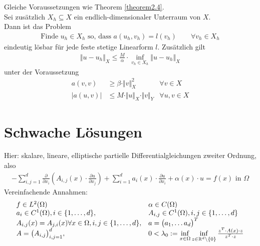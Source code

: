 \begin{theorem}\label{theorem2.5}
	Gleiche Voraussetzungen wie Theorem \ref{theorem2.4}.\\
	Sei zusätzlich $X_h\subseteq X$ ein endlich-dimensionaler Unterraum von $X$.\\
	Dann ist das Problem
	\begin{align*}
		\text{Finde }u_h\in X_h\text{ so, dass }
		a(u_h,v_h)=l(v_h)\qquad\forall v_h\in X_h
	\end{align*}
	eindeutig lösbar für jede feste stetige Linearform $l$.
	Zusätzlich gilt
	\begin{align*}
		\Vert u-u_h\Vert_X\leq\frac{M}{\alpha}\cdot\inf\limits_{v_h\in X_h}\Vert u-u_h\Vert_X
	\end{align*}
	unter der Voraussetzung
	\begin{align*}
		a(v,v)&\geq\beta\cdot\Vert v\Vert^2_X &\forall v\in X\\
		\big|a(u,v)\big|&\leq M\cdot\Vert u\Vert_X\cdot\Vert v\Vert_Y &\forall u,v\in X
	\end{align*}
\end{theorem}

\section{Schwache Lösungen} %
Hier: skalare, lineare, elliptische partielle Differentialgleichungen zweiter Ordnung, also
\begin{align*}
	-\sum\limits_{i,j=1}^d\frac{\partial}{\partial x_i}\left(A_{i,j}(x)\cdot\frac{\partial u}{\partial x_j}\right)+\sum\limits_{i=1}^d a_i(x)\cdot\frac{\partial u}{\partial x_i}+\alpha(x)\cdot u=f(x)\text{ in }\Omega
\end{align*}
Vereinfachende Annahmen:
\begin{align*}
	\begin{array}{ll}
		f\in L^2(\Omega)&\alpha \in C(\Omega)\\
		a_i\in C^1(\Omega),i\in\lbrace1,\ldots,d\rbrace, & A_{i,j}\in C^1(\Omega), i,j\in\lbrace1,\ldots,d\rbrace\\
		A_{i,j}(x)=A_{j,i}(x)\forall x\in\Omega, i,j\in\lbrace1,\ldots,d\rbrace, & a=\big(a_1,\ldots a_d\big)^T\\
		A=\big(A_{i,j}\big)^d_{i,j=1},& 0<\lambda_0:=\inf\limits_{x\in\Omega}\inf\limits_{z\in\mathbb{R}^d\setminus\lbrace0\rbrace}\frac{z^T\cdot A(x)\cdot z}{z^T\cdot z}
	\end{array}
\end{align*}

